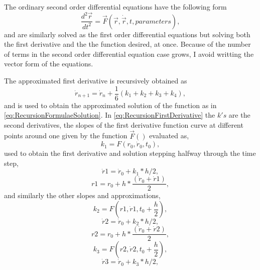 \documentclass[12pt]{article}
\begin{document}
The ordinary second order differential equations have the following form
\begin{equation}
  \label{eq:SecondODE}
  \frac{d^{2}\vec{r}}{dt^{2}} = \vec{F}(\vec{r},\dot{\vec{r}},t,parameters),
\end{equation}
and are similarly solved as the first order differential equations but
solving both the first derivative and the the function desired, at
once. Because of the number of terms in the second order 
differential equation case grows, I avoid writting the vector form of the
equations.

The approximated first derivative is recursively obtained as
\begin{equation}
  \label{eq:RecursionFirstDerivative}
  \dot{r}_{n+1} = \dot{r}_{n} + \frac{1}{6}(k_{1}+k_{2}+k_{3}+k_{4}),
\end{equation}
and is used to obtain the approximated solution of the function as in
\eqref{eq:RecursionFormulaeSolution}. In
\eqref{eq:RecursionFirstDerivative} the \(k's\) are the second
derivatives, the slopes of the first derivative function curve at
different points around one given by the function \(\vec{F}()\)
evaluated as,
\begin{equation}
  \label{eq:First1}
  k_{1}= F(r_{0},\dot{r}_{0},t_{0}),
\end{equation}
used to obtain the first derivative and solution stepping halfway
through the time step,
\begin{equation}
  \label{eq:velocity1}
  \dot{r}1 = \dot{r}_{0} + k_{1}*h/2,
\end{equation}
\begin{equation}
  \label{eq:Sol_1}
  r1 = r_{0} + h*\frac{(\dot{r}_{0}+\dot{r}1)}{2},
\end{equation}
and similarly the other slopes and approximations,
\begin{equation}
  \label{eq:slope2}
  k_{2}= F(r1, \dot{r}1, t_{0}+\frac{h}{2}),
\end{equation}
\begin{equation}
  \label{eq:velocity2}
  \dot{r}2 = \dot{r}_{0} + k_{2}*h/2,
\end{equation}
\begin{equation}
  \label{eq:Sol_2}
  r2 = r_{0} + h*\frac{(\dot{r}_{0}+\dot{r}2)}{2},
\end{equation}
\begin{equation}
  \label{eq:slope3}
  k_{3}= F(r2, \dot{r}2, t_{0}+\frac{h}{2}),
\end{equation}
\begin{equation}
  \label{eq:velocity2}
  \dot{r}3 = \dot{r}_{0} + k_{3}*h/2,
\end{equation}
\end{document}
